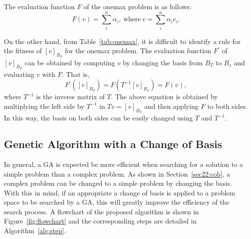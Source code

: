 The evaluation function $ F $ of the onemax problem is as follows:
\begin{equation*}
F\left(v\right)=\sum_{i}^{n}\alpha_i,\ \text{where}\ v=\sum_{i}^{n}{\alpha_ie_i}.
\end{equation*}

On the other hand, from Table~\ref{tab:onemax}, it is difficult to identify a rule for the fitness of $ \left[v\right]_{B_T} $ for the onemax problem. The evaluation function $ F^\prime $ of $ \left[v\right]_{B_T} $ can be obtained by computing $ v $ by changing the basis from $ B_T $ to $ B_s $ and evaluating $ v $ with $ F $. That is,
\begin{equation}
F^\prime\left(\left[v\right]_{B_T}\right)=F\left(T^{-1}\left[v\right]_{B_T}\right)=F\left(v\right),
\end{equation}
where $ T^{-1} $ is the inverse matrix of $ T $. The above equation is obtained by multiplying the left side by $ T^{-1} $ in $ Tv=\left[v\right]_{B_T} $ and then applying $ F $ to both sides. In this way, the basis on both sides can be easily changed using $ T $ and $ T^{-1} $.

\subsection{Genetic Algorithm with a Change of Basis}
In general, a GA is expected be more efficient when searching for a solution to a simple problem than a complex problem. As shown in Section~\ref{sec22:cob}, a complex problem can be changed to a simple problem by changing the basis. With this in mind, if an appropriate a change of basis is applied to a problem space to be searched by a GA, this will greatly improve the efficiency of the search process. A flowchart of the proposed algorithm is shown in Figure~\ref{fig:flowchart} and the corresponding steps are detailed in Algorithm~\ref{alg:step}.

